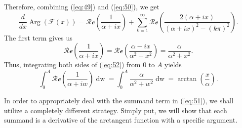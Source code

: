\documentclass[preprint,12pt,nopreprintline]{elsarticle}
\begin{document}
Therefore, combining (\ref{eq:49}) and (\ref{eq:50}), we get
\begin{equation}\label{eq:51}
\frac{d}{dx}\operatorname{Arg}\left(\mathscr{F}\left(x\right)\right)=\mathscr{Re}\left(\frac{1}{\alpha+ix}\right)+\sum_{k=1}^{\infty}\mathscr{Re}\left(\frac{2\left(\alpha+ix\right)}{\left(\alpha+ix\right)^2-\left(k\pi\right)^2}\right).
\end{equation}
The first term gives us
\begin{equation}\label{eq:52}
\mathscr{Re}\left(\frac{1}{\alpha+ix}\right)=\mathscr{Re}\left({\frac{\alpha-ix}{\alpha^2+x^2}}\right)=\frac{\alpha}{\alpha^2+x^2}.
\end{equation}
Thus, integrating both sides of (\ref{eq:52}) from $0$ to $A$ yields
\begin{equation}\label{eq:53}
\int_0^A\mathscr{Re}\left(\frac{1}{\alpha+iw}\right)\operatorname{dw}=\int_0^A\frac{\alpha}{\alpha^2+w^2}\operatorname{dw}=\operatorname{arctan}\left(\frac{x}{\alpha}\right).
\end{equation}

In order to appropriately deal with the summand term in (\ref{eq:51}), we shall utilize a completely different strategy. Simply put, we will show that each summand is a derivative of the arctangent function with a specific argument. 
\end{document}
